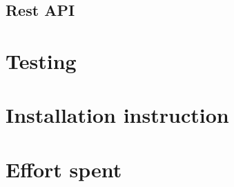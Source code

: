\documentclass[a4paper,oneside,11pt]{article}
\begin{document}
\newpage
\subsection{Rest API}

\newpage
    \section{Testing}
    
\newpage
    \section{Installation instruction}
    
\newpage
    \section{Effort spent}
    
\end{document}
